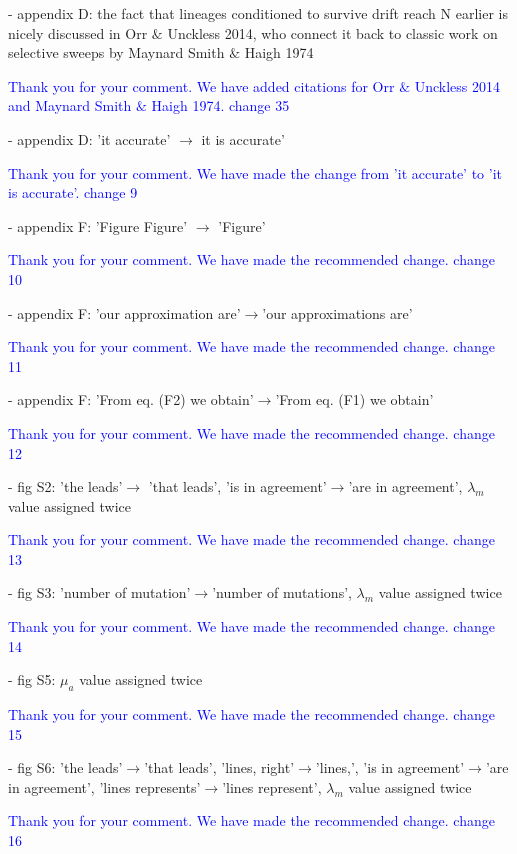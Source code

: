 \documentclass[11pt,a4paper]{article}
\begin{document}
- appendix D: the fact that lineages conditioned to survive drift reach N earlier is nicely discussed in Orr $\&$ Unckless 2014, who connect it back to classic work on selective sweeps by Maynard Smith $\&$ Haigh 1974

\textcolor{blue}{Thank you for your comment. We have added citations for Orr $\&$ Unckless 2014 and Maynard Smith $\&$ Haigh 1974. change 35} 

- appendix D: 'it accurate' $\rightarrow$ it is accurate'

\textcolor{blue}{Thank you for your comment. We have made the change from 'it accurate' to 'it is accurate'. change 9} 

- appendix F: 'Figure Figure' $\rightarrow$ 'Figure'

\textcolor{blue}{Thank you for your comment. We have made the recommended change. change 10} 

- appendix F: 'our approximation are'$\rightarrow$'our approximations are'

\textcolor{blue}{Thank you for your comment. We have made the recommended change. change 11} 

- appendix F: 'From eq. (F2) we obtain'$\rightarrow$'From eq. (F1) we obtain'

\textcolor{blue}{Thank you for your comment. We have made the recommended change. change 12} 

- fig S2: 'the leads'$\rightarrow$ 'that leads', 'is in agreement'$\rightarrow$'are in agreement', $\lambda_m$ value assigned twice

\textcolor{blue}{Thank you for your comment. We have made the recommended change. change 13} 

- fig S3: 'number of mutation'$\rightarrow$'number of mutations', $\lambda_m$ value assigned twice

\textcolor{blue}{Thank you for your comment. We have made the recommended change. change 14} 

- fig S5: $\mu_a$ value assigned twice

\textcolor{blue}{Thank you for your comment. We have made the recommended change. change 15} 

- fig S6: 'the leads'$\rightarrow$'that leads', 'lines, right'$\rightarrow$'lines,', 'is in agreement'$\rightarrow$'are in agreement', 'lines represents'$\rightarrow$'lines represent', $\lambda_m$ value assigned twice

\textcolor{blue}{Thank you for your comment. We have made the recommended change. change 16} 
\end{document}
